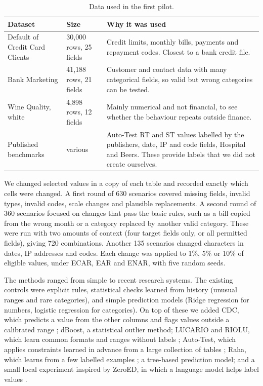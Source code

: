 \documentclass[11pt,a4paper]{article}
\begin{document}
\begin{table}[htbp]
\centering
\small
\begin{tabularx}{\textwidth}{@{}p{3.6cm}p{2.2cm}L@{}}
\toprule
Dataset & Size & Why it was used \\
\midrule
Default of Credit Card Clients \cite{uci-credit} & 30{,}000 rows, 25 fields & Credit limits, monthly bills, payments and repayment codes. Closest to a bank credit file. \\
Bank Marketing \cite{uci-bank} & 41{,}188 rows, 21 fields & Customer and contact data with many categorical fields, so valid but wrong categories can be tested. \\
Wine Quality, white \cite{uci-wine} & 4{,}898 rows, 12 fields & Mainly numerical and not financial, to see whether the behaviour repeats outside finance. \\
Published benchmarks \cite{autotest,raha} & various & Auto-Test RT and ST values labelled by the publishers, date, IP and code fields, Hospital and Beers. These provide labels that we did not create ourselves. \\
\bottomrule
\end{tabularx}
\caption{Data used in the first pilot.}
\label{tab:a-data}
\end{table}

We changed selected values in a copy of each table and recorded exactly which cells were changed. A first round of 630 scenarios covered missing fields, invalid types, invalid codes, scale changes and plausible replacements. A second round of 360 scenarios focused on changes that pass the basic rules, such as a bill copied from the wrong month or a category replaced by another valid category. These were run with two amounts of context (four target fields only, or all permitted fields), giving 720 combinations. Another 135 scenarios changed characters in dates, IP addresses and codes. Each change was applied to 1\%, 5\% or 10\% of eligible values, under ECAR, EAR and ENAR, with five random seeds.

The methods ranged from simple to recent research systems. The existing controls were explicit rules, statistical checks learned from history (unusual ranges and rare categories), and simple prediction models (Ridge regression for numbers, logistic regression for categories). On top of these we added CDC, which predicts a value from the other columns and flags values outside a calibrated range \cite{cdc}; dBoost, a statistical outlier method; LUCARIO and RIOLU, which learn common formats and ranges without labels \cite{lucario,riolu}; Auto-Test, which applies constraints learned in advance from a large collection of tables \cite{autotest}; Raha, which learns from a few labelled examples \cite{raha}; a tree-based prediction model; and a small local experiment inspired by ZeroED, in which a language model helps label values \cite{zeroed}.
\end{document}
